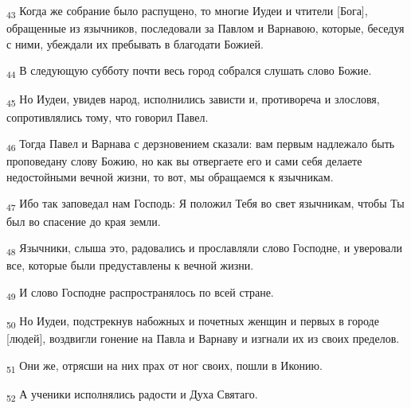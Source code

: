\begin{tcolorbox}
\textsubscript{43} Когда же собрание было распущено, то многие Иудеи и чтители [Бога], обращенные из язычников, последовали за Павлом и Варнавою, которые, беседуя с ними, убеждали их пребывать в благодати Божией.
\end{tcolorbox}
\begin{tcolorbox}
\textsubscript{44} В следующую субботу почти весь город собрался слушать слово Божие.
\end{tcolorbox}
\begin{tcolorbox}
\textsubscript{45} Но Иудеи, увидев народ, исполнились зависти и, противореча и злословя, сопротивлялись тому, что говорил Павел.
\end{tcolorbox}
\begin{tcolorbox}
\textsubscript{46} Тогда Павел и Варнава с дерзновением сказали: вам первым надлежало быть проповедану слову Божию, но как вы отвергаете его и сами себя делаете недостойными вечной жизни, то вот, мы обращаемся к язычникам.
\end{tcolorbox}
\begin{tcolorbox}
\textsubscript{47} Ибо так заповедал нам Господь: Я положил Тебя во свет язычникам, чтобы Ты был во спасение до края земли.
\end{tcolorbox}
\begin{tcolorbox}
\textsubscript{48} Язычники, слыша это, радовались и прославляли слово Господне, и уверовали все, которые были предуставлены к вечной жизни.
\end{tcolorbox}
\begin{tcolorbox}
\textsubscript{49} И слово Господне распространялось по всей стране.
\end{tcolorbox}
\begin{tcolorbox}
\textsubscript{50} Но Иудеи, подстрекнув набожных и почетных женщин и первых в городе [людей], воздвигли гонение на Павла и Варнаву и изгнали их из своих пределов.
\end{tcolorbox}
\begin{tcolorbox}
\textsubscript{51} Они же, отрясши на них прах от ног своих, пошли в Иконию.
\end{tcolorbox}
\begin{tcolorbox}
\textsubscript{52} А ученики исполнялись радости и Духа Святаго.
\end{tcolorbox}
